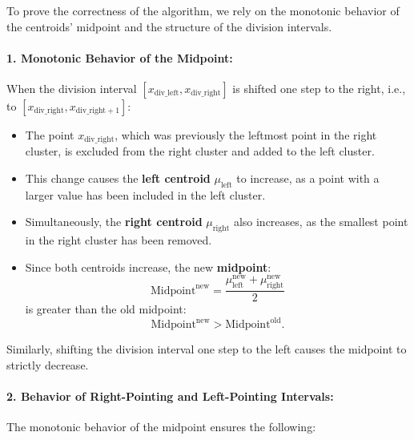 To prove the correctness of the algorithm, we rely on the monotonic behavior of the centroids’ midpoint and the structure of the division intervals.

\paragraph{1. Monotonic Behavior of the Midpoint:}  
When the division interval \([x_{\text{div\_left}}, x_{\text{div\_right}}]\) is shifted one step to the right, i.e., to \([x_{\text{div\_right}}, x_{\text{div\_right} + 1}]\):
\begin{itemize}
    \item The point \(x_{\text{div\_right}}\), which was previously the leftmost point in the right cluster, is excluded from the right cluster and added to the left cluster.
    \item This change causes the \textbf{left centroid} \(\mu_{\text{left}}\) to increase, as a point with a larger value has been included in the left cluster.
    \item Simultaneously, the \textbf{right centroid} \(\mu_{\text{right}}\) also increases, as the smallest point in the right cluster has been removed.
    \item Since both centroids increase, the new \textbf{midpoint}:
    \[
    \text{Midpoint}^{\text{new}} = \frac{\mu_{\text{left}}^{\text{new}} + \mu_{\text{right}}^{\text{new}}}{2}
    \]
    is greater than the old midpoint:
    \[
    \text{Midpoint}^{\text{new}} > \text{Midpoint}^{\text{old}}.
    \]
\end{itemize}

Similarly, shifting the division interval one step to the left causes the midpoint to strictly decrease.

\paragraph{2. Behavior of Right-Pointing and Left-Pointing Intervals:}  
The monotonic behavior of the midpoint ensures the following:

